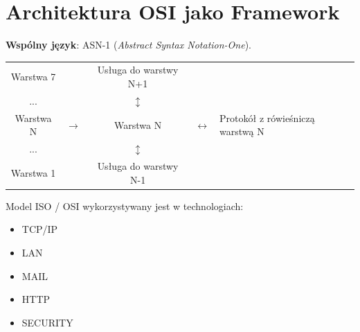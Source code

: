 \documentclass[a4paper,twoside]{article}
\begin{document}
\section{Architektura OSI jako Framework}
\textbf{Wspólny język}: ASN-1 (\emph{Abstract Syntax Notation-One}).\\
\begin{table}[h]
	\begin{tabular}{|c|lcll}
		\cline{1-1}
		Warstwa 7 &                       & Usługa do warstwy N+1          &  &                                   \\ \cline{1-1}
		...       &                       & $ \updownarrow $                   &  &                                   \\ \cline{1-1} \cline{3-3}
		Warstwa N & \multicolumn{1}{l|}{$ \rightarrow $} & \multicolumn{1}{c|}{Warstwa N} & $ \longleftrightarrow $  & Protokół z rówieśniczą warstwą N \\ \cline{1-1} \cline{3-3}
		...       &                       & $ \updownarrow $                   &  &                                   \\ \cline{1-1}
		Warstwa 1 &                       & Usługa do warstwy N-1          &  &                                   \\ \cline{1-1}
	\end{tabular}
\end{table}
Model ISO / OSI wykorzystywany jest w technologiach:\\
\begin{itemize}
	\item TCP/IP
	\item LAN
	\item MAIL
	\item HTTP
	\item SECURITY
\end{itemize} 
\end{document}
